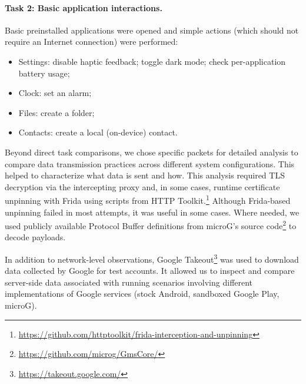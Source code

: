 \paragraph{Task 2: Basic application interactions.}
Basic preinstalled applications were opened and simple actions (which should not require an Internet connection) were performed:
\begin{itemize}
	\item Settings: disable haptic feedback; toggle dark mode; check per-application battery usage;
	\item Clock: set an alarm;
	\item Files: create a folder;
	\item Contacts: create a local (on-device) contact.
\end{itemize}

Beyond direct task comparisons, we chose specific packets for detailed analysis to compare data transmission practices across different system configurations. This helped to characterize what data is sent and how. This analysis required TLS decryption via the intercepting proxy and, in some cases, runtime certificate unpinning with Frida using scripts from HTTP Toolkit.\footnote{\url{https://github.com/httptoolkit/frida-interception-and-unpinning}} Although Frida-based unpinning failed in most attempts, it was useful in some cases. Where needed, we used publicly available Protocol Buffer definitions from microG's source code\footnote{\url{https://github.com/microg/GmsCore/}} to decode payloads.

In addition to network-level observations, Google Takeout\footnote{\url{https://takeout.google.com/}} was used to download data collected by Google for test accounts. It allowed us to inspect and compare server-side data associated with running scenarios involving different implementations of Google services (stock Android, sandboxed Google Play, microG).